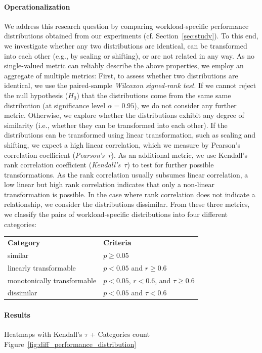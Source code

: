 \paragraph*{Operationalization}
We address this research question by comparing workload-specific performance distributions obtained from our experiments (cf. Section~\ref{sec:study}). To this end, we investigate whether any two distributions are identical, can be transformed into each other (e.g., by scaling or shifting), or are not related in any way. As no single-valued metric can reliably describe the above properties, we employ an aggregate of multiple metrics: First, to assess whether two distributions are identical, we use the paired-sample \emph{Wilcoxon signed-rank test}. If we cannot reject the null hypothesis ($H_0$) that the distributions come from the same same distribution (at significance level $\alpha=0.95$), we do not consider any further metric. 
Otherwise, we explore whether the distributions exhibit any degree of similarity (i.e., whether they can be transformed into each other). If the distributions can be transformed using linear transformation, such as scaling and shifting, we expect a high linear correlation, which we measure by Pearson’s correlation coefficient (\emph{Pearson's~r}). As an additional metric, we use Kendall’s rank correlation coefficient (\emph{Kendall's~$\tau$}) to test for further possible transformations. As the rank correlation usually subsumes linear correlation, a low linear but high rank correlation indicates that only a non-linear transformation is possible. In the case where rank correlation does not indicate a relationship, we consider the distributions dissimilar. From these three metrics, we classify the pairs of workload-specific distributions into four different categories:
\vspace{1mm}

\begin{tabular}{p{3.9cm}l}
	 \textbf{Category} & \textbf{Criteria} \\
	{similar} & $p \geq 0.05$ \\
	{linearly transformable} & $p < 0.05$ and $r \geq 0.6$ \\
	{monotonically transformable} & $p < 0.05$, $r < 0.6$, and $\tau \geq 0.6$ \\
	{dissimilar}  & $p < 0.05$ and $\tau < 0.6$ \\
\end{tabular}

\paragraph*{Results} {\color{blue} Heatmaps with Kendall's $\tau$ + Categories count Figure~\ref{fig:diff_performance_distribution}}

